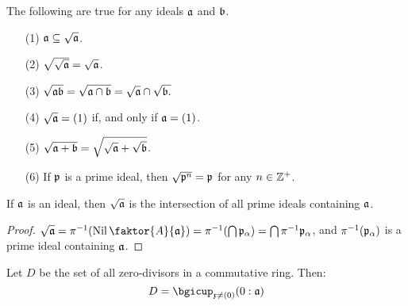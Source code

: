 \begin{lemma}\label{lemma_1.10.11}
  The following are true for any ideals $\af$ and  $\bf$.
  \begin{enumerate}
    \item[(1)] $\af \subseteq \sqrt{\af}$.

    \item[(2)] $\sqrt{\sqrt{\af}}=\sqrt{\af}$.

    \item[(3)] $\sqrt{\af\bf}=\sqrt{\af \cap \bf}=\sqrt{\af} \cap \sqrt{\bf.}$

    \item[(4)] $\sqrt{\af}=(1)$ if, and only if $\af=(1)$.

    \item[(5)] $\sqrt{\af+\bf}=\sqrt{\sqrt{\af}+\sqrt{\bf}}$.

    \item[(6)] If $\pf$ is a prime ideal, then $\sqrt{\pf^n}=\pf$ for any $n \in
      \Z^+$.
  \end{enumerate}
\end{lemma}

\begin{lemma}\label{lemma_1.10.12}
  If $\af$ is an ideal, then $\sqrt{\af}$ is the intersection of all prime
  ideals containing $\af$.
\end{lemma}
\begin{proof}
  $\sqrt{\af}=\inv{\pi}(\Nil{\faktor{A}{\af}})=\inv{\pi}(\bigcap{\pf_\a})=
  \bigcap{\inv{\pi}\pf_\a}$, and  $\inv{\pi}(\pf_\a)$ is a prime ideal
  containing $\af$.
\end{proof}

\begin{lemma}\label{lemma_1.10.13}
  Let $D$ be the set of all zero-divisors in a commutative ring. Then:
  \begin{equation}
    D=\bgicup_{\xf \neq (0)}{(0:\af)}
  \end{equation}
\end{lemma}
